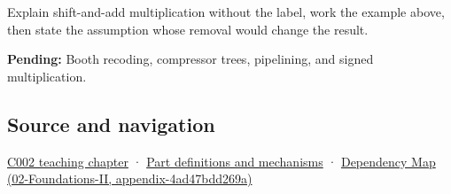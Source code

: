 Explain shift-and-add multiplication without the label, work the example above, then state the assumption whose removal would change the result.

\textbf{Pending:} Booth recoding, compressor trees, pipelining, and signed multiplication.

\subsection{Source and navigation}\label{appendix-a65290d66ed9-source-and-navigation}

\hyperref[01-foundations-i-ch001-arithmetic-becomes-a-policy]{C002 teaching chapter} · \hyperref[appendix-fd090d982a15]{Part definitions and mechanisms} · \href{../02-Foundations-II/main.pdf\#nameddest=appendix-4ad47bdd269a}{Dependency Map (02-Foundations-II, appendix-4ad47bdd269a)}
